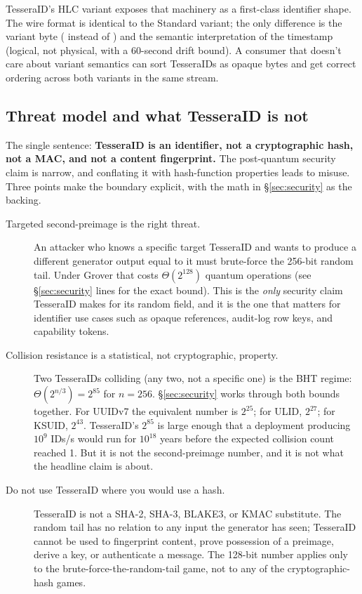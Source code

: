 TesseraID's HLC variant exposes that machinery as a first-class identifier shape. The wire format is identical to the Standard variant; the only difference is the variant byte ( instead of ) and the semantic interpretation of the timestamp (logical, not physical, with a 60-second drift bound). A consumer that doesn't care about variant semantics can sort TesseraIDs as opaque bytes and get correct ordering across both variants in the same stream.

\subsection{Threat model and what TesseraID is not}
\label{sec:threat-model}

The single sentence: \textbf{TesseraID is an identifier, not a cryptographic hash, not a MAC, and not a content fingerprint.} The post-quantum security claim is narrow, and conflating it with hash-function properties leads to misuse. Three points make the boundary explicit, with the math in \S\ref{sec:security} as the backing.

\begin{description}
  \item[Targeted second-preimage is the right threat.] An attacker who knows a specific target TesseraID and wants to produce a different generator output equal to it must brute-force the 256-bit random tail. Under Grover \citep{grover1996} that costs $\Theta(2^{128})$ quantum operations (see \S\ref{sec:security} lines for the exact bound). This is the \emph{only} security claim TesseraID makes for its random field, and it is the one that matters for identifier use cases such as opaque references, audit-log row keys, and capability tokens.

  \item[Collision resistance is a statistical, not cryptographic, property.] Two TesseraIDs colliding (any two, not a specific one) is the BHT \citep{bht1998} regime: $\Theta(2^{n/3}) = 2^{85}$ for $n = 256$. \S\ref{sec:security} works through both bounds together. For UUIDv7 the equivalent number is $2^{25}$; for ULID, $2^{27}$; for KSUID, $2^{43}$. TesseraID's $2^{85}$ is large enough that a deployment producing $10^9$ IDs/s would run for $10^{18}$ years before the expected collision count reached 1. But it is not the second-preimage number, and it is not what the headline claim is about.

  \item[Do not use TesseraID where you would use a hash.] TesseraID is not a SHA-2, SHA-3, BLAKE3, or KMAC substitute. The random tail has no relation to any input the generator has seen; TesseraID cannot be used to fingerprint content, prove possession of a preimage, derive a key, or authenticate a message. The 128-bit number applies only to the brute-force-the-random-tail game, not to any of the cryptographic-hash games.
\end{description}


